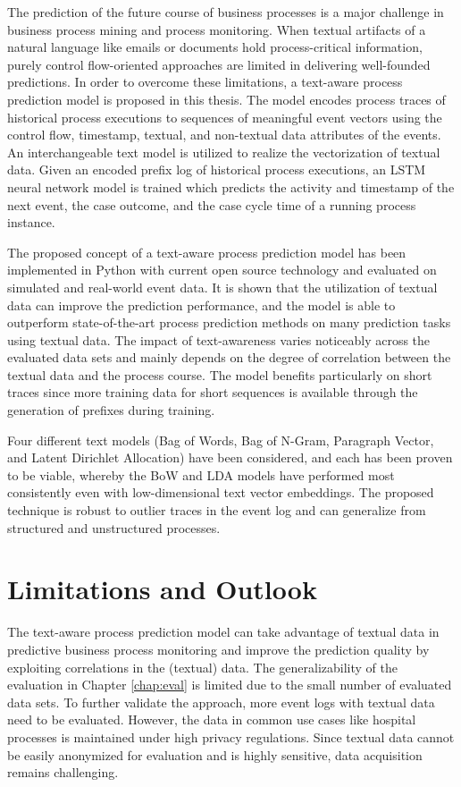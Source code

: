 The prediction of the future course of business processes is a major challenge in business process mining and process monitoring.
When textual artifacts of a natural language like emails or documents hold process-critical information, purely control flow-oriented approaches are limited in delivering well-founded predictions.
In order to overcome these limitations, a text-aware process prediction model is proposed in this thesis.
The model encodes process traces of historical process executions to sequences of meaningful event vectors using the control flow, timestamp, textual, and non-textual data attributes of the events.
An interchangeable text model is utilized to realize the vectorization of textual data.
Given an encoded prefix log of historical process executions, an LSTM neural network model is trained which predicts the activity and timestamp of the next event, the case outcome, and the case cycle time of a running process instance.

The proposed concept of a text-aware process prediction model has been implemented in Python with current open source technology and evaluated on simulated and real-world event data.
It is shown that the utilization of textual data can improve the prediction performance, and the model is able to outperform state-of-the-art process prediction methods on many prediction tasks using textual data.
The impact of text-awareness varies noticeably across the evaluated data sets and mainly depends on the degree of correlation between the textual data and the process course.
The model benefits particularly on short traces since more training data for short sequences is available through the generation of prefixes during training.

Four different text models (Bag of Words, Bag of N-Gram, Paragraph Vector, and Latent Dirichlet Allocation) have been considered, and each has been proven to be viable, whereby the BoW and LDA models have performed most consistently even with low-dimensional text vector embeddings.
The proposed technique is robust to outlier traces in the event log and can generalize from structured and unstructured processes.

\section{Limitations and Outlook}

The text-aware process prediction model can take advantage of textual data in predictive business process monitoring and improve the prediction quality by exploiting correlations in the (textual) data.
The generalizability of the evaluation in Chapter \ref{chap:eval} is limited due to the small number of evaluated data sets.
To further validate the approach, more event logs with textual data need to be evaluated.
However, the data in common use cases like hospital processes is maintained under high privacy regulations.
Since textual data cannot be easily anonymized for evaluation and is highly sensitive, data acquisition remains challenging.

